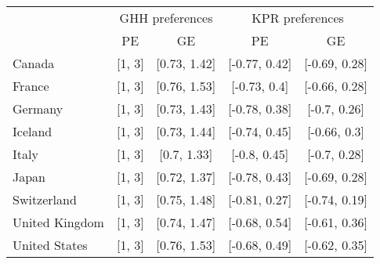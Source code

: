 \begin{tabular}{lcccc} 
& \multicolumn{2}{c}{GHH preferences}   & \multicolumn{2}{c}{KPR preferences}   \tabularnewline 
& PE                & GE                & PE                & GE                \tabularnewline 
\hline 
\hline 
Canada & {[}1, 3{]} & {[}0.73, 1.42{]} & {[}-0.77, 0.42{]} & {[}-0.69, 0.28{]} \tabularnewline 
France & {[}1, 3{]} & {[}0.76, 1.53{]} & {[}-0.73, 0.4{]} & {[}-0.66, 0.28{]} \tabularnewline 
Germany & {[}1, 3{]} & {[}0.73, 1.43{]} & {[}-0.78, 0.38{]} & {[}-0.7, 0.26{]} \tabularnewline 
Iceland & {[}1, 3{]} & {[}0.73, 1.44{]} & {[}-0.74, 0.45{]} & {[}-0.66, 0.3{]} \tabularnewline 
Italy & {[}1, 3{]} & {[}0.7, 1.33{]} & {[}-0.8, 0.45{]} & {[}-0.7, 0.28{]} \tabularnewline 
Japan & {[}1, 3{]} & {[}0.72, 1.37{]} & {[}-0.78, 0.43{]} & {[}-0.69, 0.28{]} \tabularnewline 
Switzerland & {[}1, 3{]} & {[}0.75, 1.48{]} & {[}-0.81, 0.27{]} & {[}-0.74, 0.19{]} \tabularnewline 
United Kingdom & {[}1, 3{]} & {[}0.74, 1.47{]} & {[}-0.68, 0.54{]} & {[}-0.61, 0.36{]} \tabularnewline 
United States & {[}1, 3{]} & {[}0.76, 1.53{]} & {[}-0.68, 0.49{]} & {[}-0.62, 0.35{]} \tabularnewline 
\hline 
\end{tabular} 
